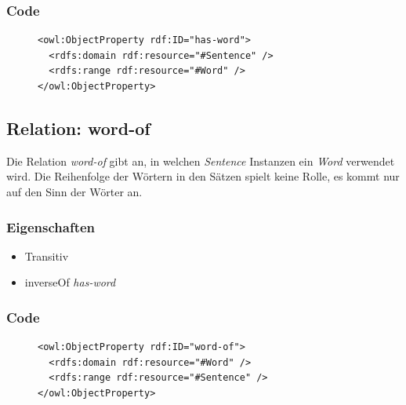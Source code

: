 \documentclass[
    11pt,
    latin1,
    a4paper,
    oneside
]{scrreprt}
\begin{document}
\subsubsection{Code} \label{sec:rel_hasword_code}

\begin{figure}[H]
 \lstset{language=XML}
 \begin{lstlisting}[label=owl:hasword,caption={Die Relation \emph{has-word} gibt an, welches Wort in einem Satz vorkommt}]
<owl:ObjectProperty rdf:ID="has-word">
  <rdfs:domain rdf:resource="#Sentence" />
  <rdfs:range rdf:resource="#Word" />
</owl:ObjectProperty>
 \end{lstlisting}
\end{figure}


\subsection{Relation: word-of} \label{sec:rel_wordof}

Die Relation \emph{word-of} gibt an, in welchen \emph{Sentence} Instanzen ein \emph{Word} verwendet wird. Die Reihenfolge der W\"ortern in den S\"atzen spielt keine Rolle, es kommt nur auf den Sinn der W\"orter an.

\subsubsection{Eigenschaften} \label{sec:rel_wordof_settings}

\begin{itemize}
  \item Transitiv
  \item inverseOf \emph{has-word}
\end{itemize}

\subsubsection{Code} \label{sec:rel_wordof_code}

\begin{figure}[H]
 \lstset{language=XML}
 \begin{lstlisting}[label=owl:wordof,caption={Die Relation \emph{word-of} gibt an, in welchem Satz das Wort vorkommt}]
<owl:ObjectProperty rdf:ID="word-of">
  <rdfs:domain rdf:resource="#Word" />
  <rdfs:range rdf:resource="#Sentence" />
</owl:ObjectProperty>
 \end{lstlisting}
\end{figure}
\end{document}
